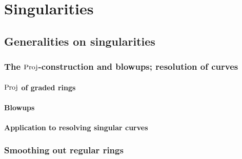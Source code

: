 \chapter{Singularities}
    \begin{abstract}
        
    \end{abstract}
    
    \section{Generalities on singularities}
        \subsection{The \texorpdfstring{$\mathrm{Proj}$}{}-construction and blowups; resolution of curves}
            \subsubsection{\texorpdfstring{$\mathrm{Proj}$}{} of graded rings}
            
            \subsubsection{Blowups}
            
            \subsubsection{Application to resolving singular curves}
        
        \subsection{Smoothing out regular rings}
